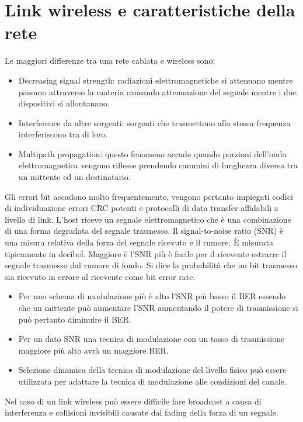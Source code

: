 \section{Link wireless e caratteristiche della rete}
Le maggiori differenze tra una rete cablata e wireless sono:
\begin{itemize}
\item Decreasing signal strength: radiazioni elettromagnetiche si attenuano mentre passano attraverso la materia causando attenuazione del segnale mentre i due dispositivi si allontanano.
\item Interference da altre sorgenti: sorgenti che trasmettono alla stessa frequenza interferiscono tra di loro. 
\item Multipath propagation: questo fenomeno accade quando porzioni dell'onda elettromagnetica vengono riflesse prendendo cammini di lunghezza diversa tra un mittente ed un destinatario.
\end{itemize}
Gli errori bit accadono molto frequentemente, vengono pertanto impiegati codici di individuazione errori CRC potenti e protocolli di data transfer affidabili a livello di link. L'host riceve un segnale 
elettromagnetico che \`e una combinazione di una forma degradata del segnale trasmesso. Il signal-to-noise ratio (SNR) \`e una misura relativa della forza del segnale ricevuto e il rumore. \`E misurata 
tipicamente in decibel. Maggiore \`e l'SNR pi\`u \`e facile per il ricevente estrarre il segnale trasmesso dal rumore di fondo. Si dice la probabilit\`a che un bit trasmesso sia ricevuto in errore al ricevente
come bit error rate.
\begin{itemize}
\item Per uno schema di modulazione pi\`u \`e alto l'SNR pi\`u basso il BER essendo che un mittente pu\`o aumentare l'SNR aumentando il potere di trasmissione si pu\`o pertanto diminuire il BER. 
\item Per un dato SNR una tecnica di modulazione con un tasso di trasmissione maggiore pi\`u alto avr\`a un maggiore BER. 
\item Selezione dinamica della tecnica di modulazione del livello fisico pu\`o essere utilizzata per adattare la tecnica di modulazione alle condizioni del canale. 
\end{itemize}
Nel caso di un link wireless pu\`o essere difficile fare broadcast a causa di interferenza e collisioni invisibili causate dal fading della forza di un segnale. 
